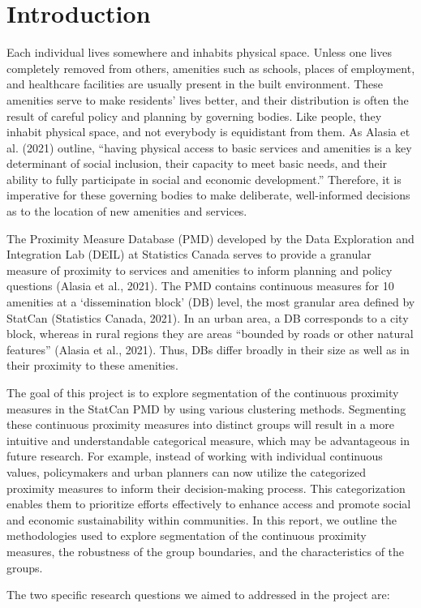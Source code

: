 \documentclass[11pt, a4paper]{article}
\begin{document}
\section{Introduction}
\par

\setcounter{page}{1}

\normalsize
Each individual lives somewhere and inhabits physical space. Unless one lives completely removed from others, amenities such as schools, places of employment, and healthcare facilities are usually present in the built environment. These amenities serve to make residents’ lives better, and their distribution is often the result of careful policy and planning by governing bodies. Like people, they inhabit physical space, and not everybody is equidistant from them. As Alasia et al. (2021) outline, ``having physical access to basic services and amenities is a key determinant of social inclusion, their capacity to meet basic needs, and their ability to fully participate in social and economic development.'' Therefore, it is imperative for these governing bodies to make deliberate, well-informed decisions as to the location of new amenities and services.
\par
The Proximity Measure Database (PMD) developed by the Data Exploration and Integration Lab (DEIL) at Statistics Canada serves to provide a granular measure of proximity to services and amenities to inform planning and policy questions (Alasia et al., 2021). The PMD contains continuous measures for 10 amenities at a ‘dissemination block’ (DB) level, the most granular area defined by StatCan (Statistics Canada, 2021). In an urban area, a DB corresponds to a city block, whereas in rural regions they are areas ``bounded by roads or other natural features'' (Alasia et al., 2021). Thus, DBs differ broadly in their size as well as in their proximity to these amenities.
\par
The goal of this project is to explore segmentation of the continuous proximity measures in the StatCan PMD by using various clustering methods. Segmenting these continuous proximity measures into distinct groups will result in a more intuitive and understandable categorical measure, which may be advantageous in future research. For example, instead of working with individual continuous values, policymakers and urban planners can now utilize the categorized proximity measures to inform their decision-making process. This categorization enables them to prioritize efforts effectively to enhance access and promote social and economic sustainability within communities. In this report, we outline the methodologies used to explore segmentation of the continuous proximity measures, the robustness of the group boundaries, and the characteristics of the groups.
\par
The two specific research questions we aimed to addressed in the project are:
\end{document}
